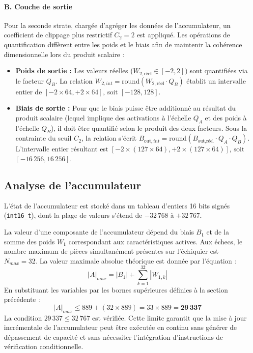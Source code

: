 \documentclass[11pt, a4paper]{article}
\begin{document}
\paragraph{B. Couche de sortie}
Pour la seconde strate, chargée d'agréger les données de l'accumulateur, un coefficient de clippage plus restrictif $C_2 = 2$ est appliqué. Les opérations de quantification diffèrent entre les poids et le biais afin de maintenir la cohérence dimensionnelle lors du produit scalaire :
\begin{itemize}
    \item \textbf{Poids de sortie :} Les valeurs réelles ($W_{2,\text{réel}} \in [-2, 2]$) sont quantifiées via le facteur $Q_B$. La relation $W_{2,int} = \text{round}(W_{2,\text{réel}} \cdot Q_B)$ établit un intervalle entier de $[-2 \times 64, +2 \times 64]$, soit \textbf{$[-128, 128]$}.
    \item \textbf{Biais de sortie :} Pour que le biais puisse être additionné au résultat du produit scalaire (lequel implique des activations à l'échelle $Q_A$ et des poids à l'échelle $Q_B$), il doit être quantifié selon le produit des deux facteurs. Sous la contrainte du seuil $C_2$, la relation s'écrit $B_{\text{out},int} = \text{round}(B_{\text{out},\text{réel}} \cdot Q_A \cdot Q_B)$. L'intervalle entier résultant est $[-2 \times (127 \times 64), +2 \times (127 \times 64)]$, soit \textbf{$[-16\,256, 16\,256]$}.
\end{itemize}

\subsection{Analyse de l'accumulateur}

L'état de l'accumulateur est stocké dans un tableau d'entiers 16 bits signés (\texttt{int16\_t}), dont la plage de valeurs s'étend de $-32\,768$ à $+32\,767$. 

La valeur d'une composante de l'accumulateur dépend du biais $B_1$ et de la somme des poids $W_1$ correspondant aux caractéristiques actives. Aux échecs, le nombre maximum de pièces simultanément présentes sur l'échiquier est $N_{max} = 32$. La valeur maximale absolue théorique est donnée par l'équation :
\begin{equation}
    |A|_{max} = |B_1| + \sum_{k=1}^{32} |W_{1,k}|
\end{equation}
En substituant les variables par les bornes supérieures définies à la section précédente :
\begin{equation}
    |A|_{max} \leq 889 + (32 \times 889) = 33 \times 889 = \mathbf{29\,337}
\end{equation}
La condition $29\,337 \leq 32\,767$ est vérifiée. Cette limite garantit que la mise à jour incrémentale de l'accumulateur peut être exécutée en continu sans générer de dépassement de capacité et sans nécessiter l'intégration d'instructions de vérification conditionnelle.
\end{document}
